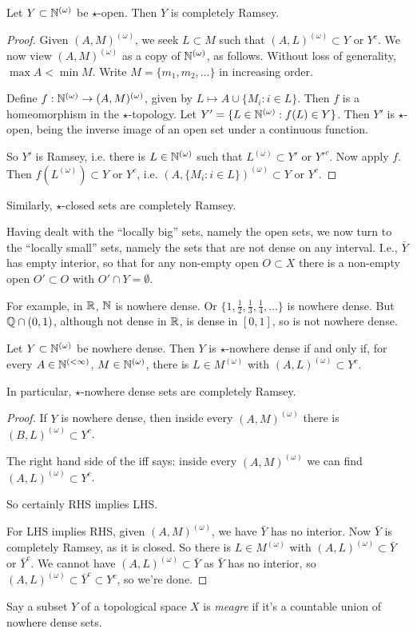 \documentclass[10pt,a4paper]{article}
\begin{document}
\begin{theorem}
  Let $Y \subset \mathbb{N}^{(\omega)}$ be $\star$-open. Then $Y$ is completely Ramsey.
\end{theorem}
\begin{proof}
  Given $(A,M)^{(\omega)}$, we seek $L \subset M$ such that $(A,L)^{(\omega)} \subset Y$ or $Y^c$. We now view $(A,M)^{(\omega)}$ as a copy of $\mathbb{N}^{(\omega)}$, as follows. Without loss of generality, $\max A < \min M$. Write $M = \{m_1, m_2, \ldots\}$ in increasing order.

  Define $f:\mathbb{N}^{(\omega)} \to (A, M)^{(\omega)}$, given by $L \mapsto A \cup \{M_i: i \in L\}$. Then $f$ is a homeomorphism in the $\star$-topology. Let $Y' = \{L \in \mathbb{N}^{(\omega)} : f(L) \in Y\}$. Then $Y'$ is $\star$-open, being the inverse image of an open set under a continuous function.

  So $Y'$ is Ramsey, i.e. there is $L \in \mathbb{N}^{(\omega)}$ such that $L^{(\omega)} \subset Y'$ or $Y'^c$. Now apply $f$. Then $f(L^{(\omega)}) \subset Y$ or $Y^c$, i.e. $(A, \{M_i: i \in L\})^{(\omega)} \subset Y$ or $Y^c$.
\end{proof}
Similarly, $\star$-closed sets are completely Ramsey.

Having dealt with the ``locally big'' sets, namely the open sets, we now turn to the ``locally small'' sets, namely the sets that are not dense on any interval. I.e., $\bar{Y}$ has empty interior, so that for any non-empty open $O \subset X$ there is a non-empty open $O' \subset O$ with $O'\cap Y = \emptyset$.

For example, in $\mathbb{R}$, $\mathbb{N}$ is nowhere dense. Or $\{1, \frac12, \frac13, \frac14, \ldots\}$ is nowhere dense. But $\mathbb{Q} \cap (0,1)$, although not dense in $\mathbb{R}$, is dense in $[0,1]$, so is not nowhere dense.

\begin{proposition}
  Let $Y \subset \mathbb{N}^{(\omega)}$ be nowhere dense. Then $Y$ is $\star$-nowhere dense if and only if, for every $A \in \mathbb{N}^{(<\infty)}$, $M \in \mathbb{N}^{(\omega)}$, there is $L \in M^{(\omega)}$ with $(A,L)^{(\omega)} \subset Y^c$.

  In particular, $\star$-nowhere dense sets are completely Ramsey.
\end{proposition}
\begin{proof}
  If $Y$ is nowhere dense, then inside every $(A, M)^{(\omega)}$ there is $(B, L)^{(\omega)} \subset Y^c$.

  The right hand side of the iff says: inside every $(A, M)^{(\omega)}$ we can find $(A, L)^{(\omega)} \subset Y^c$.

  So certainly RHS implies LHS.

  For LHS implies RHS, given $(A,M)^{(\omega)}$, we have $\bar{Y}$ has no interior. Now $\bar{Y}$ is completely Ramsey, as it is closed. So there is $L \in M^{(\omega)}$ with $(A,L)^{(\omega)} \subset \bar{Y}$ or $\bar{Y}^c$. We cannot have $(A,L)^{(\omega)} \subset \bar{Y}$ as $\bar{Y}$ has no interior, so $(A,L)^{(\omega)} \subset \bar{Y}^c \subset Y^c$, so we're done.
\end{proof}
Say a subset $Y$ of a topological space $X$ is \emph{meagre} if it's a countable union of nowhere dense sets.
\end{document}
